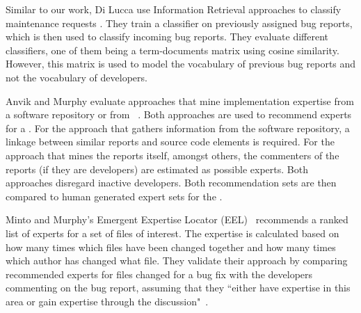 
Similar to our work, Di Lucca \etal use Information Retrieval approaches to classify maintenance requests \cite{Lucc02b}. They train a classifier on previously assigned bug reports, which is then used to classify incoming bug reports. They evaluate different classifiers, one of them being a term-documents matrix using cosine similarity. However, this matrix is used to model the vocabulary of previous bug reports and not the vocabulary of developers.

Anvik and Murphy evaluate approaches that mine implementation expertise from a software repository or from \BRs~\cite{Anvik07}. Both approaches are used to recommend experts for a \BR. For the approach that gathers information from the software repository, a linkage between similar reports and source code elements is required. For the approach that mines the reports itself, amongst others, the commenters of the reports (if they are developers) are estimated as possible experts. Both approaches disregard inactive developers. Both recommendation sets are then compared to human generated expert sets for the \BR.

Minto and Murphy's Emergent Expertise Locator (EEL)~\cite{Minto07} recommends a ranked list of experts for a set of files of interest. The expertise is calculated based on how many times which files have been changed together and how many times which author has changed what file. They validate their approach by comparing recommended experts for files changed for a bug fix with the developers commenting on the bug report, assuming that they ``either have expertise in this area or gain expertise through the discussion"~\cite{Minto07}.


%
%

